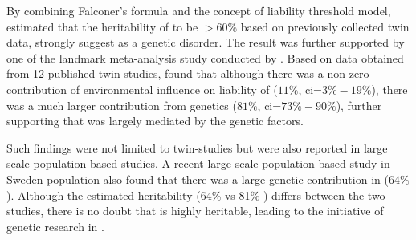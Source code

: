 	By combining Falconer's formula and the concept of liability threshold model, \citet{Gottesman01071967} estimated that the heritability of  to be $>60\%$ based on previously collected twin data, strongly suggest  as a genetic disorder.
	The result was further supported by one of the landmark meta-analysis study conducted by \citet{Sullivan2003}.
	Based on data obtained from 12 published  twin studies, \citet{Sullivan2003} found that although there was a non-zero contribution of environmental influence on liability of  ($11\%$, \gls{ci}=$3\%-19\%$), there was a much larger contribution from genetics ($81\%$, \gls{ci}=$73\%-90\%$), further supporting that  was largely mediated by the genetic factors.
	
	Such findings were not limited to twin-studies but were also reported in large scale population based studies.
	A recent large scale population based study in Sweden population \citep{Lichtenstein2009} also found that there was a large genetic contribution in  ($64\%$).
	Although the estimated heritability (64\% \citep{Lichtenstein2009} vs 81\% \citep{Sullivan2003}) differs between the two studies, there is no doubt that  is highly heritable, leading to the initiative of genetic research in .
	
	